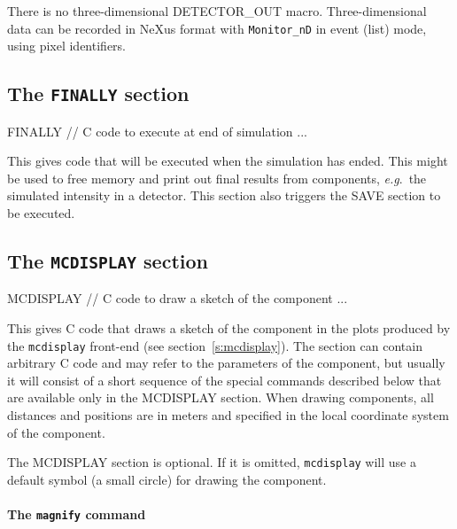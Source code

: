 There is no three-dimensional DETECTOR\_OUT macro. Three-dimensional
data can be recorded in NeXus format with \texttt{Monitor\_nD} in event
(list) mode, using pixel identifiers.

\subsection{The \texttt{FINALLY} section}
\label{s:comp-finally}

\begin{mcstas}
FINALLY
// C code to execute at end of simulation ...
\end{mcstas}

This gives code that will be executed when the simulation has ended. This might
be used to free memory and print out final results from components,
\textit{e.g}.\ the simulated intensity in a detector. This section also triggers
the SAVE section to be executed.

\subsection{The \texttt{MCDISPLAY} section}
\label{s:comp-mcdisplay}

\begin{mcstas}
MCDISPLAY
// C code to draw a sketch of the component ...
\end{mcstas}

This gives C code that draws a sketch of the component in the plots
produced by the \verb+mcdisplay+ front-end (see
section~\ref{s:mcdisplay}). The section can contain arbitrary C code and
may refer to the parameters of the component, but usually it will
consist of a short sequence of the special commands described below that
are available only in the MCDISPLAY section.
When drawing components, all distances and positions are in meters and
specified in the local coordinate system of the component.

The MCDISPLAY section is optional. If it is omitted, \verb+mcdisplay+
will use a default symbol (a small circle) for drawing the component.

\paragraph{The \texttt{magnify} command}

